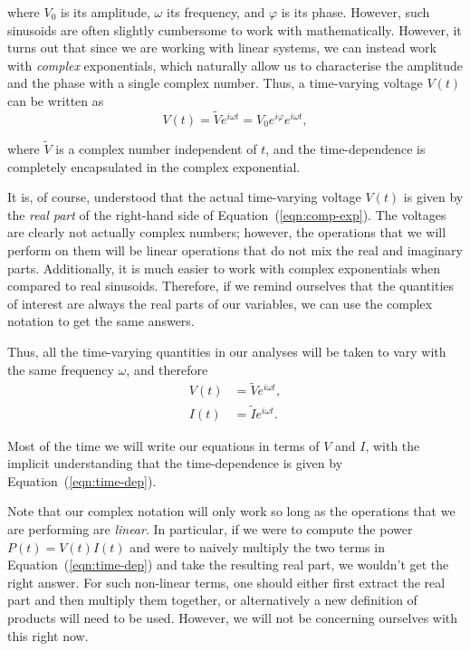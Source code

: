 where $V_0$ is its amplitude, $\omega$ its frequency, and $\varphi$ is its phase. However, such sinusoids are often slightly cumbersome to work with mathematically. However, it turns out that since we are working with linear systems, we can instead work with \textsl{complex} exponentials, which naturally allow us to characterise the amplitude and the phase with a single complex number. Thus, a time-varying voltage $V(t)$ can be written as 
\begin{equation}
    V(t) = \widetilde{V} e^{i\omega t} = V_0 e^{i\varphi} e^{i\omega t},
    \label{eqn:comp-exp}
\end{equation}

where $\widetilde{V}$ is a complex number independent of $t$, and the time-dependence is completely encapsulated in the complex exponential.

\begin{imp}
    It is, of course, understood that the actual time-varying voltage $V(t)$ is  given by the \textsl{real part} of the right-hand side of Equation~(\ref{eqn:comp-exp}). The voltages are clearly not actually complex numbers; however, the operations that we will perform on them will be linear operations that do not mix the real and imaginary parts. Additionally, it is much easier to work with complex exponentials when compared to real sinusoids. Therefore, if we remind ourselves that the quantities of interest are always the real parts of our variables, we can use the complex notation to get the same answers.
\end{imp}

Thus, all the time-varying quantities in our analyses will be taken to vary with the same frequency $\omega$, and therefore
\begin{equation}
    \begin{aligned}
        V(t) &= \widetilde{V} e^{i\omega t},\\
        I(t) &= \widetilde{I} e^{i \omega t}. 
    \end{aligned}
    \label{eqn:time-dep}
\end{equation}

Most of the time we will write our equations in terms of $V$ and $I$, with the implicit understanding that the time-dependence is given by Equation~(\ref{eqn:time-dep}).

\begin{imp}
    Note that our complex notation will only work so long as the operations that we are performing are \textsl{linear}. In particular, if we were to compute the power $P(t) = V(t) I(t)$ and were to naively multiply the two terms in Equation~(\ref{eqn:time-dep}) and take the resulting real part, we wouldn't get the right answer. For such non-linear terms, one should either first extract the real part and then multiply them together, or alternatively a new definition of products will need to be used. However, we will not be concerning ourselves with this right now.
\end{imp}



